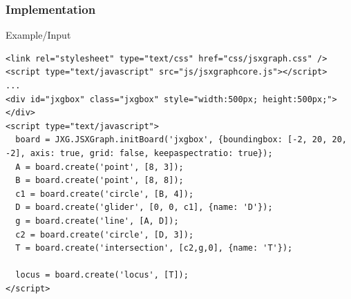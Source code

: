 \documentclass{beamer}
\begin{document}

\begin{frame}[fragile]
  \frametitle{Implementation}

  \begin{block}{Example/Input}
    \begin{lstlisting}
<link rel="stylesheet" type="text/css" href="css/jsxgraph.css" />
<script type="text/javascript" src="js/jsxgraphcore.js"></script>
...
<div id="jxgbox" class="jxgbox" style="width:500px; height:500px;"></div>
<script type="text/javascript">
  board = JXG.JSXGraph.initBoard('jxgbox', {boundingbox: [-2, 20, 20, -2], axis: true, grid: false, keepaspectratio: true});
  A = board.create('point', [8, 3]);
  B = board.create('point', [8, 8]);
  c1 = board.create('circle', [B, 4]);
  D = board.create('glider', [0, 0, c1], {name: 'D'});
  g = board.create('line', [A, D]);
  c2 = board.create('circle', [D, 3]);
  T = board.create('intersection', [c2,g,0], {name: 'T'});

  locus = board.create('locus', [T]);
</script>
    \end{lstlisting}
  \end{block}
\end{frame}

\end{document}
